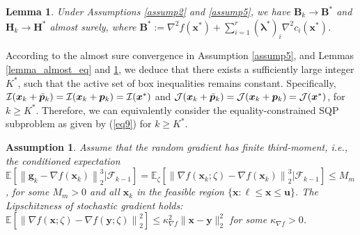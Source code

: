 \documentclass[aos]{imsart}
\numberwithin{equation}{section}
\theoremstyle{plain}
\newtheorem{assumption}{Assumption}
\newtheorem{lemma}{Lemma}
\begin{document}
\begin{lemma}
\label{lemma_almostsure_HB}
    Under Assumptions \ref{assump2} and \ref{assump5}, we have  $\bm{B}_k \to \bm{B}^{*}$ and $\bm{H}_k \to \bm{H}^{*}$ almost surely, where $\bm{B}^{*} := \nabla^2 f(\bm{x}^{*}) + \sum_{i=1}^{r} (\bm{\lambda}^{*})_{i} \nabla^2 c_i(\bm{x}^{*})$.
\end{lemma}

According to the almost sure convergence in Assumption \ref{assump5}, and Lemmas \ref{lemma_almost_eq} and \ref{lemma_almostsure_HB}, we deduce that there exists a sufficiently large integer $K^{*}$, such that the active set of box inequalities remains constant. Specifically, $\mathcal{I}(\bm{x}_k + \Bar{\bm{p}}_k) = \mathcal{I}(\bm{x}_k + \bm{p}_k) = \mathcal{I}(\bm{x}^{*})$ and $\mathcal{J}(\bm{x}_k + \Bar{\bm{p}}_k) = \mathcal{J}(\bm{x}_k + \bm{p}_k) = \mathcal{J}(\bm{x}^{*})$, for $k \geq K^{*}$. Therefore, we can equivalently consider the equality-constrained SQP subproblem as given by (\ref{eq9}) for $k \geq K^{*}$.



\begin{assumption}
\label{assump9}
   Assume that the random gradient has finite third-moment, i.e., the conditioned expectation $\mathbb{E}\left[ \left\|\bm{g}_k - \nabla f(\bm{x}_k) \right\|_2^3 | \mathcal{F}_{k-1} \right] = \mathbb{E}_{\zeta}\left[ \left\| \nabla f(\bm{x}_k; \zeta)  - \nabla f(\bm{x}_k) \right\|_2^3 | \mathcal{F}_{k-1} \right] \leq M_{m}$, for some $M_{m}>0$ and all $\bm{x}_k$ in the feasible region $\{\bm{x}: \bm{\ell} \leq \bm{x} \leq \bm{u}\}$. The Lipschitzness of stochastic gradient holds: $\mathbb{E}\left[ \left\| \nabla f(\bm{x};\zeta) - \nabla f(\bm{y};\zeta) \right\|_2^2 \right] \leq \kappa_{\nabla f}^2 \|\bm{x} - \bm{y}\|_2^2$ for some $\kappa_{\nabla f} > 0$.
\end{assumption}
\end{document}
